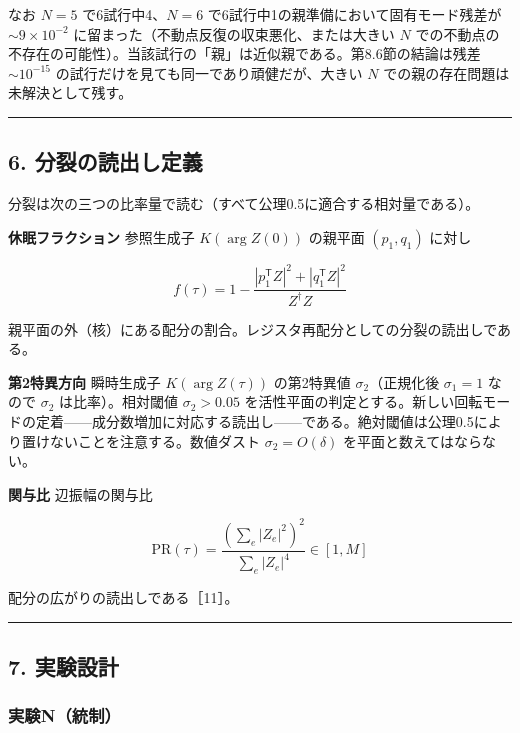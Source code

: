 \documentclass[
  a4paper,
]{ltjsarticle}
\begin{document}
なお \(N=5\) で6試行中4、\(N=6\)
で6試行中1の親準備において固有モード残差が \(\sim9\times10^{-2}\)
に留まった（不動点反復の収束悪化、または大きい \(N\)
での不動点の不存在の可能性）。当該試行の「親」は近似親である。第8.6節の結論は残差
\(\sim10^{-15}\) の試行だけを見ても同一であり頑健だが、大きい \(N\)
での親の存在問題は未解決として残す。

\begin{center}\rule{0.5\linewidth}{0.5pt}\end{center}

\subsection{6.
分裂の読出し定義}\label{ux5206ux88c2ux306eux8aadux51faux3057ux5b9aux7fa9}

分裂は次の三つの比率量で読む（すべて公理0.5に適合する相対量である）。

\textbf{休眠フラクション} 参照生成子 \(K(\arg Z(0))\) の親平面
\((p_1,q_1)\) に対し

\[
f(\tau)=1-\frac{|p_1^{\mathsf T}Z|^2+|q_1^{\mathsf T}Z|^2}{Z^{\dagger}Z}
\]

親平面の外（核）にある配分の割合。レジスタ再配分としての分裂の読出しである。

\textbf{第2特異方向} 瞬時生成子 \(K(\arg Z(\tau))\) の第2特異値
\(\sigma_2\)（正規化後 \(\sigma_1=1\) なので \(\sigma_2\)
は比率）。相対閾値 \(\sigma_2>0.05\)
を活性平面の判定とする。新しい回転モードの定着------成分数増加に対応する読出し------である。絶対閾値は公理0.5により置けないことを注意する。数値ダスト
\(\sigma_2=O(\delta)\) を平面と数えてはならない。

\textbf{関与比} 辺振幅の関与比

\[
\mathrm{PR}(\tau)=\frac{\left(\sum_e|Z_e|^2\right)^2}{\sum_e|Z_e|^4}\in[1,M]
\]

配分の広がりの読出しである［11］。

\begin{center}\rule{0.5\linewidth}{0.5pt}\end{center}

\subsection{7. 実験設計}\label{ux5b9fux9a13ux8a2dux8a08}

\subsubsection{実験N（統制）}\label{ux5b9fux9a13nux7d71ux5236}
\end{document}
